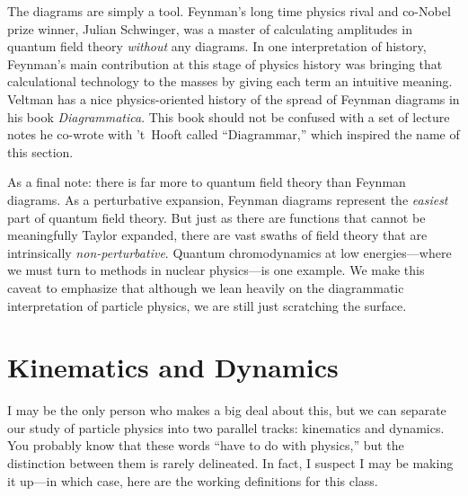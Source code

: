 \documentclass[12pt, oneside]{report}    %
\let\oldsection\section
\def\section{%
  \setcounter{sidenote}{1}%
  \oldsection
}
\begin{document}
The diagrams are simply a tool. Feynman's long time physics rival and co-Nobel prize winner, Julian Schwinger, was a master of calculating amplitudes in quantum field theory \emph{without} any diagrams. In one interpretation of history, Feynman's main contribution at this stage of physics history was bringing that calculational technology to the masses by giving each term an intuitive meaning. Veltman has a nice physics-oriented history of the spread of Feynman diagrams in his book \emph{Diagrammatica}\autocite{Veltman:1994wz}. This book should not be confused with a set of lecture notes he co-wrote with 
't~Hooft called ``Diagrammar\autocite{tHooft:1973wag},'' which inspired the name of this section.


As a final note: there is far more to quantum field theory than Feynman diagrams. As a perturbative expansion, Feynman diagrams represent the \emph{easiest} part of quantum field theory. But just as there are functions that cannot be meaningfully Taylor expanded, there are vast swaths of field theory that are intrinsically \emph{non-perturbative}. Quantum chromodynamics at low energies---where we must turn to methods in nuclear physics---is one example. We make this caveat to emphasize that although we lean heavily on the diagrammatic interpretation of particle physics, we are still just scratching the surface.






\section{Kinematics and Dynamics}

I may be the only person who makes a big deal about this, but we can separate our study of particle physics into two parallel tracks: {kinematics} and {dynamics}. You probably know that these words ``have to do with physics,'' but the distinction between them is rarely delineated. In fact, I suspect I may be making it up---in which case, here are the working definitions for this class. 
\end{document}
